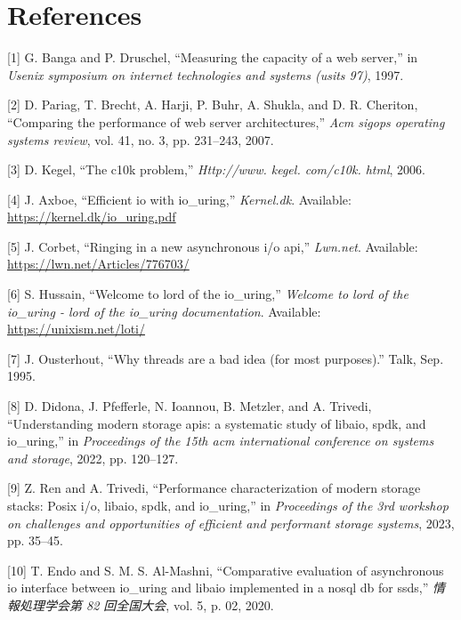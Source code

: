 \documentclass[conference]{IEEEtran}{}
\begin{document}
\section{References}
\label{sec:orgc151969}
\begin{hangparas}{1.5em}{1}
\hypertarget{citeproc_bib_item_1}{[1] G. Banga and P. Druschel, “Measuring the capacity of a web server,” in \textit{Usenix symposium on internet technologies and systems (usits 97)}, 1997.}

\hypertarget{citeproc_bib_item_2}{[2] D. Pariag, T. Brecht, A. Harji, P. Buhr, A. Shukla, and D. R. Cheriton, “Comparing the performance of web server architectures,” \textit{Acm sigops operating systems review}, vol. 41, no. 3, pp. 231–243, 2007.}

\hypertarget{citeproc_bib_item_3}{[3] D. Kegel, “The c10k problem,” \textit{Http://www. kegel. com/c10k. html}, 2006.}

\hypertarget{citeproc_bib_item_4}{[4] J. Axboe, “Efficient io with io\_uring,” \textit{Kernel.dk}. Available: \url{https://kernel.dk/io_uring.pdf}}

\hypertarget{citeproc_bib_item_5}{[5] J. Corbet, “Ringing in a new asynchronous i/o api,” \textit{Lwn.net}. Available: \url{https://lwn.net/Articles/776703/}}

\hypertarget{citeproc_bib_item_6}{[6] S. Hussain, “Welcome to lord of the io\_uring,” \textit{Welcome to lord of the io\_uring - lord of the io\_uring documentation}. Available: \url{https://unixism.net/loti/}}

\hypertarget{citeproc_bib_item_7}{[7] J. Ousterhout, “Why threads are a bad idea (for most purposes).” Talk, Sep. 1995.}

\hypertarget{citeproc_bib_item_8}{[8] D. Didona, J. Pfefferle, N. Ioannou, B. Metzler, and A. Trivedi, “Understanding modern storage apis: a systematic study of libaio, spdk, and io\_uring,” in \textit{Proceedings of the 15th acm international conference on systems and storage}, 2022, pp. 120–127.}

\hypertarget{citeproc_bib_item_9}{[9] Z. Ren and A. Trivedi, “Performance characterization of modern storage stacks: Posix i/o, libaio, spdk, and io\_uring,” in \textit{Proceedings of the 3rd workshop on challenges and opportunities of efficient and performant storage systems}, 2023, pp. 35–45.}

\hypertarget{citeproc_bib_item_10}{[10] T. Endo and S. M. S. Al-Mashni, “Comparative evaluation of asynchronous io interface between io\_uring and libaio implemented in a nosql db for ssds,” \textit{情報処理学会第 82 回全国大会}, vol. 5, p. 02, 2020.}


\end{hangparas}
\end{document}
